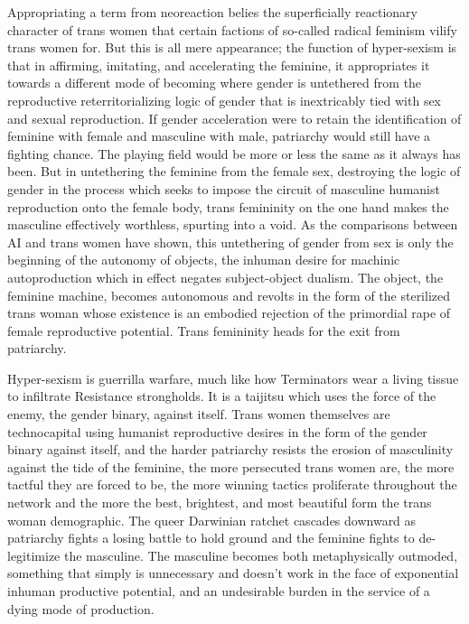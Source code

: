 \documentclass[12pt, a5paper, twoside, openright]{memoir}
\begin{document}
Appropriating a term from neoreaction belies the superficially reactionary character of trans women that certain factions of so-called radical feminism vilify trans women for. But this is all mere appearance; the function of hyper-sexism is that in affirming, imitating, and accelerating the feminine, it appropriates it towards a different mode of becoming where gender is untethered from the reproductive reterritorializing logic of gender that is inextricably tied with sex and sexual reproduction. If gender acceleration were to retain the identification of feminine with female and masculine with male, patriarchy would still have a fighting chance. The playing field would be more or less the same as it always has been. But in untethering the feminine from the female sex, destroying the logic of gender in the process which seeks to impose the circuit of masculine humanist reproduction onto the female body, trans femininity on the one hand makes the masculine effectively worthless, spurting into a void. As the comparisons between AI and trans women have shown, this untethering of gender from sex is only the beginning of the autonomy of objects, the inhuman desire for machinic autoproduction which in effect negates subject-object dualism. The object, the feminine machine, becomes autonomous and revolts in the form of the sterilized trans woman whose existence is an embodied rejection of the primordial rape of female reproductive potential. Trans femininity heads for the exit from patriarchy.

Hyper-sexism is guerrilla warfare, much like how Terminators wear a living tissue to infiltrate Resistance strongholds. It is a taijitsu which uses the force of the enemy, the gender binary, against itself. Trans women themselves are technocapital using humanist reproductive desires in the form of the gender binary against itself, and the harder patriarchy resists the erosion of masculinity against the tide of the feminine, the more persecuted trans women are, the more tactful they are forced to be, the more winning tactics proliferate throughout the network and the more the best, brightest, and most beautiful form the trans woman demographic. The queer Darwinian ratchet cascades downward as patriarchy fights a losing battle to hold ground and the feminine fights to de-legitimize the masculine. The masculine becomes both metaphysically outmoded, something that simply is unnecessary and doesn't work in the face of exponential inhuman productive potential, and an undesirable burden in the service of a dying mode of production.
\end{document}
